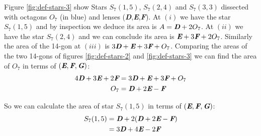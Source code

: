 \documentclass[11pt]{article}
\def\mathbi#1{\textbf{\em #1}}
\begin{document}
Figure \ref{fig:def-stars-3} show Stars $S_7(1,5)$, $S_7(2,4)$ and $S_7(3,3)$ dissected with octagons \mathbi{$O_7$} (in blue) and lenses (\mathbi{D},\mathbi{E},\mathbi{F}). At $(i)$ we have the star $S_7(1,5)$ and by inspection we deduce its area is $A = \mathbi{D} + 2\mathbi{$O_7$}$. At $(ii)$ we have the star $S_7(2,4)$ and we can conclude its area is $\mathbi{E} + 3\mathbi{F} + 2\mathbi{$O_7$}$. Similarly the area of the 14-gon at $(iii)$ is $3\mathbi{D} + \mathbi{E} + 3\mathbi{F} + \mathbi{$O_7$}$. Comparing the areas of the two 14-gons of figures \ref{fig:def-stars-2} and \ref{fig:def-stars-3} we can find the area of \mathbi{$O_7$} in terms of $(\mathbi{E},\mathbi{F},\mathbi{G})$:
\begin{align}
4\mathbi{D} + 3\mathbi{E} + 2\mathbi{F} &= 
 3\mathbi{D} + \mathbi{E} + 3\mathbi{F} + \mathbi{$O_7$}\nonumber\\
\mathbi{$O_7$} &= \mathbi{D} + 2\mathbi{E} - \mathbi{F}
\end{align}

So we can calculate the area of star $S_7(1,5)$ in terms of $(\mathbi{E},\mathbi{F},\mathbi{G})$:
\begin{align}
S_7(1,5) &= \mathbi{D} + 2(\mathbi{D} + 2\mathbi{E} - \mathbi{F}) \nonumber\\
 &= 3\mathbi{D} + 4\mathbi{E} - 2\mathbi{F}
\end{align}
\end{document}
